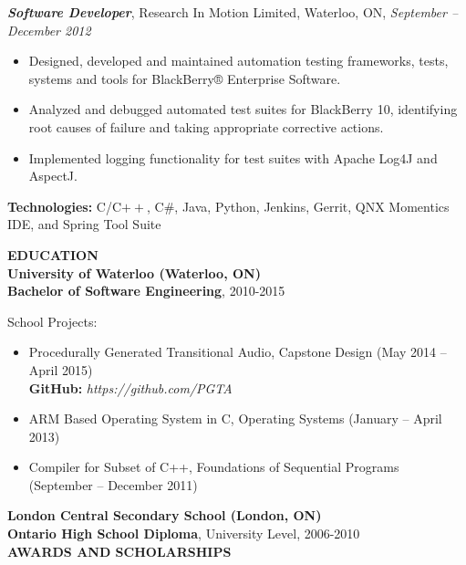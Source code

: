 \documentclass[10pt,letterpaper]{article}
\newenvironment{indentedlist}[1]%
{
\begin{list}{}%
    {\setlength{\leftmargin}{#1}}%
    \item[]%
}
{\end{list}
}
\newcommand{\job}[4]
{
    \emph{\textbf{#1}}, #2, #3, \emph{#4}
}
\newcommand{\education}[4]
{
    \textbf{#1 (#2)}\\
    \textbf{#3}, #4
}
\begin{document}
\vspace{0.8em}
\job{Software Developer}{Research In Motion Limited}{Waterloo, ON}{September -- December 2012}\\
\begin{adjustwidth}{0.1in}{0.5in}
    \begin{itemize}
	\item Designed, developed and maintained automation testing frameworks, tests, systems and tools for
	    BlackBerry® Enterprise Software.
	\item Analyzed and debugged automated test suites for BlackBerry 10, identifying root causes of failure and
	    taking appropriate corrective actions.
	\item Implemented logging functionality for test suites with Apache Log4J and AspectJ.
    \end{itemize}
    \vspace{0.5em}
    \textbf{Technologies:} C/C$++$, C\#, Java, Python, Jenkins, Gerrit, QNX Momentics IDE, and Spring Tool Suite
\end{adjustwidth}
\vspace{1em}
\textbf{EDUCATION} \hrulefill \\[0.5em]
\education{University of Waterloo}{Waterloo, ON}{Bachelor of Software Engineering}{2010-2015}
\begin{indentedlist}{2em}
		\textbf{School Projects:}
		\begin{itemize}
            \item Procedurally Generated Transitional Audio, Capstone Design (May 2014 -- April 2015) \\
            \textbf{GitHub: }\emph{https://github.com/PGTA}
			\item ARM Based Operating System in C, Operating Systems (January -- April 2013)
			\item Compiler for Subset of C++, Foundations of Sequential Programs (September -- December 2011)
		\end{itemize}
\end{indentedlist}
\education{London Central Secondary School}{London, ON}{Ontario High School Diploma}{University Level, 2006-2010}\\[1em]
\textbf{AWARDS AND SCHOLARSHIPS} \hrulefill \\
\end{document}
